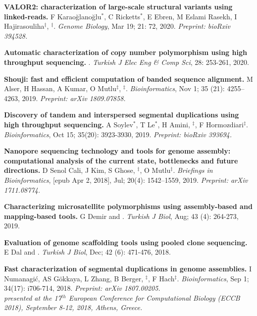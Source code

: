 \vspace{-.2cm}
 {\bf VALOR2: characterization of large-scale structural variants using linked-reads.}
 F Karaoğlanoğlu$^*$, C Ricketts$^*$, E Ebren, M Eslami Rasekh,  I Hajirasouliha$^\ddag$, \calkan{}$^\ddag$.
{\it Genome Biology}, Mar 19; 21: 72, 2020.  \textit{Preprint: bioRxiv 394528.}


   \vspace{-.2cm}
         {\bf Automatic characterization of copy number polymorphism using high throughput sequencing.}  \calkan{}. {\em Turkish J Elec Eng \& Comp Sci}, 28: 253-261, 2020.
         
\vspace{-.2cm}
{\bf Shouji: fast and efficient computation of banded sequence alignment.} M Alser, H Hassan, A Kumar, O Mutlu$^\ddag$, \calkan{}$^\ddag$.
{\em Bioinformatics}, Nov 1; 35 (21): 4255–4263, 2019. \textit{Preprint: arXiv 1809.07858.}


\vspace{-.2cm}
 {\bf Discovery of tandem and interspersed segmental duplications using high throughput sequencing.}
 A Soylev$^*$, T Le$^*$, H Amini, \calkan{}$^\ddag$, F Hormozdiari$^\ddag$.
{\em Bioinformatics}, Oct 15; 35(20): 3923-3930, 2019. \textit{Preprint: bioRxiv 393694.}


        
        
\vspace{-.2cm}

         {\bf Nanopore sequencing technology and tools for genome assembly: computational analysis of the current state, bottlenecks and future directions.}
         D Senol Cali, J Kim, S Ghose, \calkan{}$^\ddag$, O Mutlu$^\ddag$.
         {\em Briefings in Bioinformatics}, [epub Apr 2, 2018], Jul; 20(4): 1542–1559, 2019. \textit{Preprint: arXiv 1711.08774.}

\vspace{-.2cm}
         {\bf Characterizing microsatellite polymorphisms using assembly-based and mapping-based tools.}  G Demir and \calkan{}. {\em Turkish J Biol}, Aug; 43 (4): 264-273, 2019.


         \vspace{-.2cm}
         {\bf Evaluation of genome scaffolding tools using pooled clone sequencing.}  E Dal and \calkan{}. {\em Turkish J Biol}, Dec; 42 (6): 471-476, 2018.
         
         \vspace{-.2cm}

         {\bf Fast characterization of segmental duplications in genome assemblies.}
         I Numanagić,  AS Gökkaya, L Zhang, B Berger, \calkan{}$^\ddag$, F Hach$^\ddag$.
         {\em Bioinformatics}, Sep 1; 34(17): i706-714, 2018. \textit{Preprint: arXiv 1807.00205.}\\
         \hspace*{1cm}
          {\footnotesize \em presented at the 17$^{th}$ European Conference for Computational Biology (ECCB 2018), September 8-12, 2018, Athens, Greece.}

